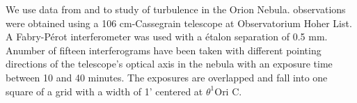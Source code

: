 We use data from \citet{1987A&A...176..347H} and \citep{arthur2016turbulence} to study of turbulence in the Orion Nebula.
\cite{1987A&A...176..347H} observations were obtained using a 106 cm-Cassegrain telescope at Observatorium Hoher List. 
A Fabry-Pérot interferometer was used with a étalon separation of 0.5 mm. 
 Anumber of fifteen interferograms have been taken with different pointing directions of the telescope's optical axis in the nebula with an exposure time between 10 and 40 minutes. 
The exposures are overlapped and fall into one square of a grid with a width of 1' centered at \(\theta^{1}\)Ori C.   





